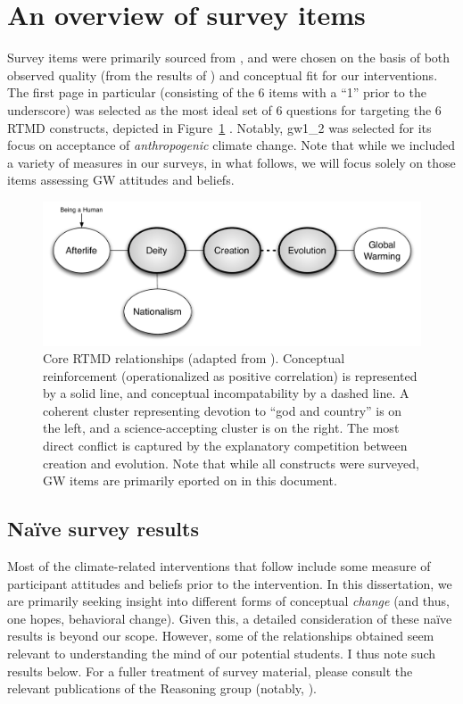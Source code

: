 \section{An overview of survey items}

Survey items were primarily sourced from \textcite{martinez_factors_2009}, and
were chosen on the basis of both observed quality (from the results of
\cite{martinez_factors_2009}) and conceptual fit for our interventions. The
first page in particular (consisting of the 6 items with a “1” prior to the
underscore) was selected as the most ideal set of 6 questions for targeting the
6 RTMD constructs, depicted in Figure~\ref{fig:rtmd}
\parencite{ranney_why_2012}.  Notably, \textsf{gw1_2} was selected for its focus
on acceptance of \emph{anthropogenic} climate change. Note that while we
included a variety of measures in our surveys, in what follows, we will focus
solely on those items assessing GW attitudes and beliefs.

\begin{figure}
    \includegraphics[width=6.5in]{rtmd.pdf}
    \caption{Core RTMD relationships (adapted from \textcite{ranney_why_2012}).
        Conceptual reinforcement (operationalized as positive correlation) is
        represented by a solid line, and conceptual incompatability by a dashed
        line. A coherent cluster representing devotion to “god and country” is
        on the left, and a science-accepting cluster is on the right. The most
        direct conflict is captured by the explanatory competition between
        creation and evolution. Note that while all constructs were surveyed,
        GW items are primarily eported on in this document.}
    \label{fig:rtmd}
\end{figure}

\subsection{Na\"ive survey results}

Most of the climate-related interventions that follow include some measure of
participant attitudes and beliefs prior to the intervention. In this
dissertation, we are primarily seeking insight into different forms of
conceptual \emph{change} (and thus, one hopes, behavioral change). Given this, a
detailed consideration of these na\"ive results is beyond our scope. However,
some of the relationships obtained seem relevant to understanding the mind of
our potential students. I thus note such results below. For a fuller treatment
of survey material, please consult the relevant publications of the Reasoning
group (notably, \cite{cohen_san_2012_f,ranney_changing_2012}).

